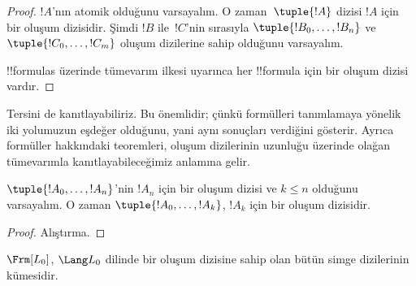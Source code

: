 \documentclass[../../../include/open-logic-section]{subfiles}
\begin{document}
\begin{proof}
$!A$'nın atomik olduğunu varsayalım. O zaman~$\tuple{!A}$ dizisi $!A$ için
bir oluşum dizisidir.
%
Şimdi $!B$ ile~$!C$'nin sırasıyla $\tuple{!B_0,\dotsc,!B_n}$ ve
$\tuple{!C_0,\dotsc,!C_m}$ oluşum dizilerine sahip olduğunu varsayalım.
%
\begin{enumerate}
\end{enumerate}
!!{formula}s üzerinde tümevarım ilkesi uyarınca her !!{formula} için bir
oluşum dizisi vardır.
\end{proof}

Tersini de kanıtlayabiliriz. Bu önemlidir; çünkü formülleri tanımlamaya
yönelik iki yolumuzun eşdeğer olduğunu, yani aynı sonuçları verdiğini
gösterir. Ayrıca formüller hakkındaki teoremleri, oluşum dizilerinin uzunluğu
üzerinde olağan tümevarımla kanıtlayabileceğimiz anlamına gelir.

\begin{lem}
$\tuple{!A_0,\dotsc,!A_n}$'nin $!A_n$ için bir oluşum dizisi ve $k \leq n$
olduğunu varsayalım. O zaman $\tuple{!A_0,\dotsc,!A_k}$, $!A_k$ için bir
oluşum dizisidir.
\end{lem}

\begin{proof}
Alıştırma.
\end{proof}

\begin{thm}
$\Frm[L_0]$, $\Lang L_0$ dilinde bir oluşum dizisine sahip olan bütün simge
dizilerinin kümesidir.
\end{thm}
\end{document}
